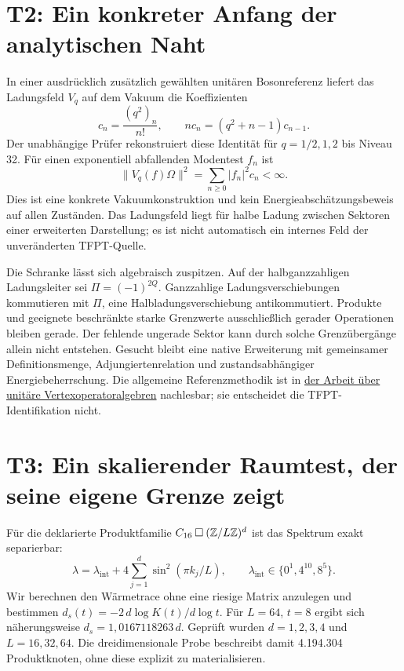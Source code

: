 \section{T2: Ein konkreter Anfang der analytischen Naht}
In einer ausdrücklich zusätzlich gewählten unitären Bosonreferenz liefert das Ladungsfeld $V_q$ auf dem Vakuum die Koeffizienten
\begin{equation}
c_n=\frac{(q^2)_n}{n!},\qquad nc_n=(q^2+n-1)c_{n-1}.
\end{equation}
Der unabhängige Prüfer rekonstruiert diese Identität für $q=1/2,1,2$ bis Niveau 32. Für einen exponentiell abfallenden Modentest $f_n$ ist
\begin{equation}
\|V_q(f)\Omega\|^2=\sum_{n\ge0}|f_n|^2c_n<\infty.
\end{equation}
Dies ist eine konkrete Vakuumkonstruktion und kein Energieabschätzungsbeweis auf allen Zuständen. Das Ladungsfeld liegt für halbe Ladung zwischen Sektoren einer erweiterten Darstellung; es ist nicht automatisch ein internes Feld der unveränderten TFPT-Quelle.

Die Schranke lässt sich algebraisch zuspitzen. Auf der halbganzzahligen Ladungsleiter sei $\Pi=(-1)^{2Q}$. Ganzzahlige Ladungsverschiebungen kommutieren mit $\Pi$, eine Halbladungsverschiebung antikommutiert. Produkte und geeignete beschränkte starke Grenzwerte ausschließlich gerader Operationen bleiben gerade. Der fehlende ungerade Sektor kann durch solche Grenzübergänge allein nicht entstehen. Gesucht bleibt eine native Erweiterung mit gemeinsamer Definitionsmenge, Adjungiertenrelation und zustandsabhängiger Energiebeherrschung. Die allgemeine Referenzmethodik ist in \href{https://arxiv.org/abs/1308.2361}{der Arbeit über unitäre Vertexoperatoralgebren} nachlesbar; sie entscheidet die TFPT-Identifikation nicht.

\section{T3: Ein skalierender Raumtest, der seine eigene Grenze zeigt}
Für die deklarierte Produktfamilie $C_{16}\mathbin{\square}(\mathbb Z/L\mathbb Z)^d$ ist das Spektrum exakt separierbar:
\begin{equation}
\lambda=\lambda_{\mathrm{int}}+4\sum_{j=1}^d\sin^2(\pi k_j/L),\qquad
\lambda_{\mathrm{int}}\in\{0^1,4^{10},8^5\}.
\end{equation}
Wir berechnen den Wärmetrace ohne eine riesige Matrix anzulegen und bestimmen $d_s(t)=-2\,d\log K(t)/d\log t$. Für $L=64$, $t=8$ ergibt sich näherungsweise $d_s=1{,}0167118263\,d$. Geprüft wurden $d=1,2,3,4$ und $L=16,32,64$. Die dreidimensionale Probe beschreibt damit 4.194.304 Produktknoten, ohne diese explizit zu materialisieren.

